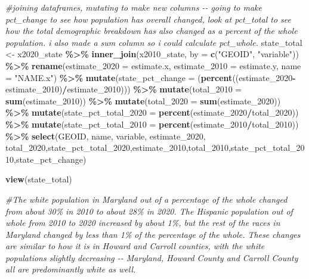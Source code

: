 \documentclass[
]{article}
\newenvironment{Shaded}{\begin{snugshade}}{\end{snugshade}}
\newcommand{\AttributeTok}[1]{\textcolor[rgb]{0.13,0.29,0.53}{#1}}
\newcommand{\CommentTok}[1]{\textcolor[rgb]{0.56,0.35,0.01}{\textit{#1}}}
\newcommand{\FunctionTok}[1]{\textcolor[rgb]{0.13,0.29,0.53}{\textbf{#1}}}
\newcommand{\NormalTok}[1]{#1}
\newcommand{\OtherTok}[1]{\textcolor[rgb]{0.56,0.35,0.01}{#1}}
\newcommand{\SpecialCharTok}[1]{\textcolor[rgb]{0.81,0.36,0.00}{\textbf{#1}}}
\newcommand{\StringTok}[1]{\textcolor[rgb]{0.31,0.60,0.02}{#1}}
\begin{document}
\begin{Shaded}
\begin{Highlighting}[]
\CommentTok{\#joining dataframes, mutating to make new columns {-}{-} going to make pct\_change to see how population has overall changed, look at pct\_total to see how the total demographic breakdown has also changed as a percent of the whole population. i also made a sum column so i could calculate pct\_whole.}
\NormalTok{state\_total }\OtherTok{\textless{}{-}}\NormalTok{ x2020\_state }\SpecialCharTok{\%\textgreater{}\%} 
  \FunctionTok{inner\_join}\NormalTok{(x2010\_state, }\AttributeTok{by =} \FunctionTok{c}\NormalTok{(}\StringTok{"GEOID"}\NormalTok{, }\StringTok{"variable"}\NormalTok{)) }\SpecialCharTok{\%\textgreater{}\%} 
  \FunctionTok{rename}\NormalTok{(}\AttributeTok{estimate\_2020 =}\NormalTok{ estimate.x, }
         \AttributeTok{estimate\_2010 =}\NormalTok{ estimate.y,}
         \AttributeTok{name =} \StringTok{"NAME.x"}\NormalTok{) }\SpecialCharTok{\%\textgreater{}\%}
  \FunctionTok{mutate}\NormalTok{(}\AttributeTok{state\_pct\_change =}\NormalTok{ (}\FunctionTok{percent}\NormalTok{((estimate\_2020}\SpecialCharTok{{-}}\NormalTok{estimate\_2010)}\SpecialCharTok{/}\NormalTok{estimate\_2010))) }\SpecialCharTok{\%\textgreater{}\%} 
  \FunctionTok{mutate}\NormalTok{(}\AttributeTok{total\_2010 =} \FunctionTok{sum}\NormalTok{(estimate\_2010)) }\SpecialCharTok{\%\textgreater{}\%} 
  \FunctionTok{mutate}\NormalTok{(}\AttributeTok{total\_2020 =} \FunctionTok{sum}\NormalTok{(estimate\_2020)) }\SpecialCharTok{\%\textgreater{}\%} 
  \FunctionTok{mutate}\NormalTok{(}\AttributeTok{state\_pct\_total\_2020 =} \FunctionTok{percent}\NormalTok{(estimate\_2020}\SpecialCharTok{/}\NormalTok{total\_2020)) }\SpecialCharTok{\%\textgreater{}\%} 
  \FunctionTok{mutate}\NormalTok{(}\AttributeTok{state\_pct\_total\_2010 =} \FunctionTok{percent}\NormalTok{(estimate\_2010}\SpecialCharTok{/}\NormalTok{total\_2010)) }\SpecialCharTok{\%\textgreater{}\%} 
  \FunctionTok{select}\NormalTok{(GEOID, name, variable, estimate\_2020, total\_2020,state\_pct\_total\_2020,estimate\_2010,total\_2010,state\_pct\_total\_2010,state\_pct\_change)}

\FunctionTok{view}\NormalTok{(state\_total)}

\CommentTok{\#The white population in Maryland out of a percentage of the whole changed from about 30\% in 2010 to about 28\% in 2020. The Hispanic population out of whole from 2010 to 2020 increased by about 1\%, but the rest of the races in Maryland changed by less than 1\% of the percentage of the whole. These changes are similar to how it is in Howard and Carroll counties, with the white populations slightly decreasing {-}{-} Maryland, Howard County and Carroll County all are predominantly white as well. }
\end{Highlighting}
\end{Shaded}
\end{document}
